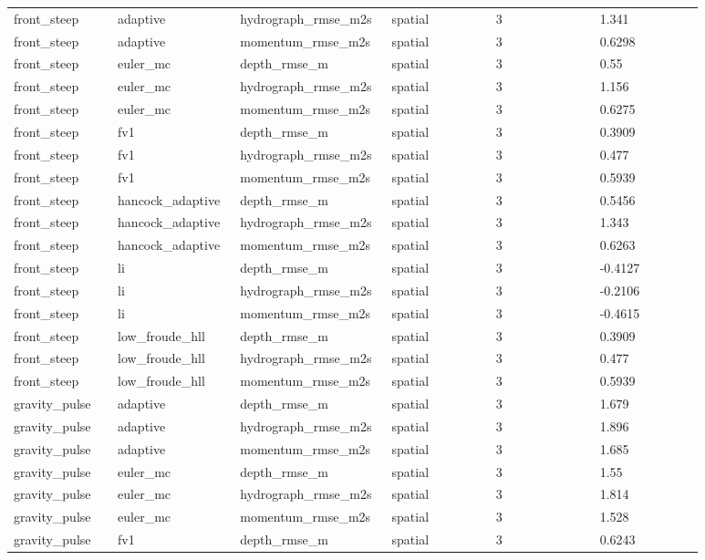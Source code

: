 \begin{longtable}{p{0.1467\linewidth}p{0.1467\linewidth}p{0.1467\linewidth}p{0.1467\linewidth}p{0.1467\linewidth}p{0.1467\linewidth}}
front\_steep & adaptive & hydrograph\_rmse\_m2s & spatial & 3 & 1.341 \\
front\_steep & adaptive & momentum\_rmse\_m2s & spatial & 3 & 0.6298 \\
front\_steep & euler\_mc & depth\_rmse\_m & spatial & 3 & 0.55 \\
front\_steep & euler\_mc & hydrograph\_rmse\_m2s & spatial & 3 & 1.156 \\
front\_steep & euler\_mc & momentum\_rmse\_m2s & spatial & 3 & 0.6275 \\
front\_steep & fv1 & depth\_rmse\_m & spatial & 3 & 0.3909 \\
front\_steep & fv1 & hydrograph\_rmse\_m2s & spatial & 3 & 0.477 \\
front\_steep & fv1 & momentum\_rmse\_m2s & spatial & 3 & 0.5939 \\
front\_steep & hancock\_adaptive & depth\_rmse\_m & spatial & 3 & 0.5456 \\
front\_steep & hancock\_adaptive & hydrograph\_rmse\_m2s & spatial & 3 & 1.343 \\
front\_steep & hancock\_adaptive & momentum\_rmse\_m2s & spatial & 3 & 0.6263 \\
front\_steep & li & depth\_rmse\_m & spatial & 3 & -0.4127 \\
front\_steep & li & hydrograph\_rmse\_m2s & spatial & 3 & -0.2106 \\
front\_steep & li & momentum\_rmse\_m2s & spatial & 3 & -0.4615 \\
front\_steep & low\_froude\_hll & depth\_rmse\_m & spatial & 3 & 0.3909 \\
front\_steep & low\_froude\_hll & hydrograph\_rmse\_m2s & spatial & 3 & 0.477 \\
front\_steep & low\_froude\_hll & momentum\_rmse\_m2s & spatial & 3 & 0.5939 \\
gravity\_pulse & adaptive & depth\_rmse\_m & spatial & 3 & 1.679 \\
gravity\_pulse & adaptive & hydrograph\_rmse\_m2s & spatial & 3 & 1.896 \\
gravity\_pulse & adaptive & momentum\_rmse\_m2s & spatial & 3 & 1.685 \\
gravity\_pulse & euler\_mc & depth\_rmse\_m & spatial & 3 & 1.55 \\
gravity\_pulse & euler\_mc & hydrograph\_rmse\_m2s & spatial & 3 & 1.814 \\
gravity\_pulse & euler\_mc & momentum\_rmse\_m2s & spatial & 3 & 1.528 \\
gravity\_pulse & fv1 & depth\_rmse\_m & spatial & 3 & 0.6243 \\

\end{longtable}
